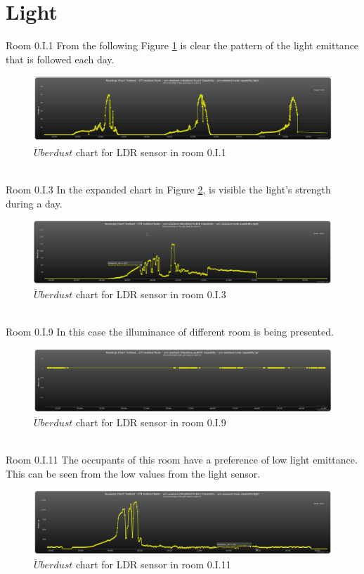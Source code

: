 \documentclass[12pt,a4paper]{report}
\begin{document}
\section{Light}
%
{Room 0.I.1}
%
From the following Figure \ref{chart_light_1} is clear the pattern of the light emittance that is followed each day.
\begin{figure}[H]
\centering
\includegraphics*[scale=0.3]{light_1}
\caption{$\ddot{U}berdust$ chart for LDR sensor in room 0.I.1}
\label{chart_light_1}
\end{figure}
\ \\
%
{Room 0.I.3}
%
In the expanded chart in Figure \ref{chart_light_3}, is visible the light's strength during a day.
\begin{figure}[H]
\centering
\includegraphics*[scale=0.3]{light_3}
\caption{$\ddot{U}berdust$ chart for LDR sensor in room 0.I.3}
\label{chart_light_3}
\end{figure}
\ \\
%
{Room 0.I.9}
%
In this case the illuminance of different room is being presented.
\begin{figure}[H]
\centering
\includegraphics*[scale=0.3]{pir_9}
\caption{$\ddot{U}berdust$ chart for LDR sensor in room 0.I.9}
\label{chart_light_9}
\end{figure}
\ \\
%
{Room 0.I.11}
%
The occupants of this room have a preference of low light emittance. This can be seen from the low values from the light sensor.
\begin{figure}[H]
\centering
\includegraphics*[scale=0.3]{light_11}
\caption{$\ddot{U}berdust$ chart for LDR sensor in room 0.I.11}
\label{chart_light_11}
\end{figure}
\ \\
%
\end{document}
